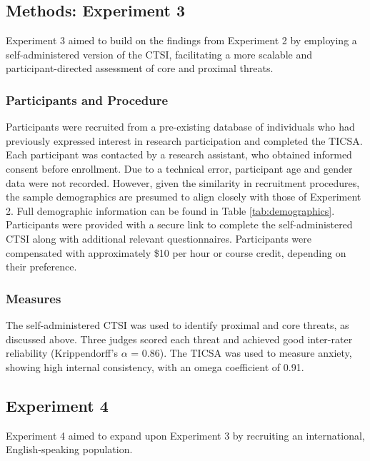 \documentclass[
  man,floatsintext]{apa7}
\begin{document}
\subsection{Methods: Experiment 3}\label{methods-experiment-3}

Experiment 3 aimed to build on the findings from Experiment 2 by employing a self-administered version of the CTSI, facilitating a more scalable and participant-directed assessment of core and proximal threats.

\subsubsection{Participants and Procedure}\label{participants-and-procedure-1}

Participants were recruited from a pre-existing database of individuals who had previously expressed interest in research participation and completed the TICSA.
Each participant was contacted by a research assistant, who obtained informed consent before enrollment.
Due to a technical error, participant age and gender data were not recorded.
However, given the similarity in recruitment procedures, the sample demographics are presumed to align closely with those of Experiment 2.
Full demographic information can be found in Table \ref{tab:demographics}.
Participants were provided with a secure link to complete the self-administered CTSI along with additional relevant questionnaires.
Participants were compensated with approximately \$10 per hour or course credit, depending on their preference.

\subsubsection{Measures}\label{measures-3}

The self-administered CTSI was used to identify proximal and core threats, as discussed above.
Three judges scored each threat and achieved good inter-rater reliability (Krippendorff's \(\alpha\) = 0.86).
The TICSA was used to measure anxiety, showing high internal consistency, with an omega coefficient of 0.91.

\subsection{Experiment 4}\label{experiment-4}

Experiment 4 aimed to expand upon Experiment 3 by recruiting an international, English-speaking population.
\end{document}
